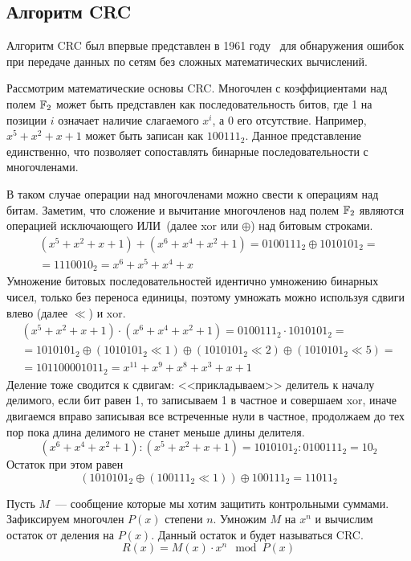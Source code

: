 
\subsection{Алгоритм CRC}
Алгоритм CRC был впервые представлен в 1961 году~\cite{4066263} для обнаружения ошибок при передаче данных по сетям без сложных математических вычислений.

Рассмотрим математические основы CRC.
Многочлен с коэффициентами над полем $\mathbb{F}_2$ может быть представлен как последовательность битов, где 1 на позиции $i$ означает наличие слагаемого $x^i$, а 0 его отсутствие.
Например, $x^5 + x^2 + x + 1$ может быть записан как $100111_2$.
Данное представление единственно, что позволяет сопоставлять бинарные последовательности с многочленами.

В таком случае операции над многочленами можно свести к операциям над битам.
Заметим, что сложение и вычитание многочленов над полем $\mathbb{F}_2$ являются операцией исключающего ИЛИ~(далее xor или $\oplus$) над битовым строками.
\begin{multline*}
    (x^5 + x^2 + x + 1) + (x^6 + x^4 + x^2 + 1) = 0100111_2 \oplus 1010101_2 = \\
    = 1110010_2 = x^6 + x^5 + x^4 + x
\end{multline*}
Умножение битовых последовательностей идентично умножению бинарных чисел, только без переноса единицы, поэтому умножать можно используя сдвиги влево (далее $\ll$) и xor.
\begin{multline*}
    (x^5 + x^2 + x + 1) \cdot (x^6 + x^4 + x^2 + 1) = 0100111_2 \cdot 1010101_2 = \\
    = 1010101_2 \oplus (1010101_2 \ll 1) \oplus (1010101_2 \ll 2) \oplus (1010101_2 \ll 5) = \\
    = 101100001011_2 = x^{11} + x^9 + x^8 + x^3 + x + 1
\end{multline*}
Деление тоже сводится к сдвигам: <<прикладываем>> делитель к началу делимого, если бит равен 1, то записываем 1 в частное и совершаем xor, иначе двигаемся вправо записывая все встреченные нули в частное, продолжаем до тех пор пока длина делимого не станет меньше длины делителя.
\[(x^6 + x^4 + x^2 + 1) : (x^5 + x^2 + x + 1) = 1010101_2 : 0100111_2 = 10_2 \]
Остаток при этом равен
\[(1010101_2 \oplus (100111_2 \ll 1)) \oplus 100111_2 = 11011_2\]

Пусть $M$~--- сообщение которые мы хотим защитить контрольными суммами.
Зафиксируем многочлен $P(x)$ степени $n$.
Умножим $M$ на $x^n$ и вычислим остаток от деления на $P(x)$.
Данный остаток и будет называться CRC.
\[R(x) = M(x) \cdot x^n \mod{P(x)}\]


